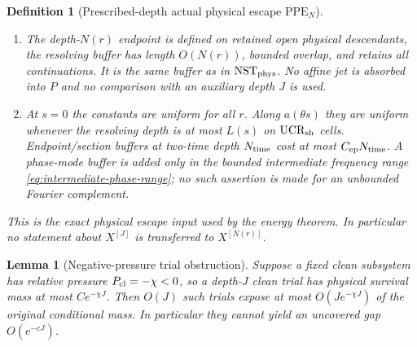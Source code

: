 \documentclass[11pt]{article}
\newtheorem{lemma}[theorem]{Lemma}
\newtheorem{definition}[theorem]{Definition}
\begin{document}
\begin{definition}[Prescribed-depth actual physical escape
$\mathrm{PPE}_{N}$]
\begin{enumerate}[label=\textup{(PPE\arabic*)}]
\begin{equation}
       \sup_{P\in\mathbb R_{d_Z}[z]}
       \mu_{\beta,Q}^{u,A}
       \{|X_{\beta,Q}^{[N(r)]}-P|\le Cr\}
       \le C\mathfrak m_{\rm PPE}(a,r,y)\,
       r^{\Theta_{\rm PPE}}.
      \end{equation}
      For some $p_{\rm PPE}>1$, the same stopped complete-tree law must also
      satisfy
      \begin{equation}
      \label{eq:ppe-mark-conditional-moment}
       \sup_{\textup{frozen parents},\,r}
       \mathbb E_{\rm stop}\!\left[
        \mathfrak m_{\rm PPE}(a,r,y)^{p_{\rm PPE}}
        \mid\mathcal F_{\rm parent}\right]\le C.
      \end{equation}
      The Borel registry makes the displayed mark a genuine stopped-tree
      random variable.  Equations \eqref{eq:ppe-weighted-amplitude-sublevel} and
      \eqref{eq:ppe-mark-conditional-moment} are required on the same
      descendants.  Neither unweighted \textup{(PPE1)} nor a mark moment
      under another partition is a substitute.  This local clause does not
      control context, stopping, buffer, gate, or continuation failures and
      does not by itself imply the full-$\mathscr W_*$ estimate
      \eqref{eq:tilted-PPE-tail}.
\item The depth-$N(r)$ endpoint is defined on retained open physical
      descendants, the resolving buffer has length $O(N(r))$, bounded
      overlap, and retains all continuations.  It is the same buffer as in
      $\mathrm{NST}_{\rm phys}$.  No affine jet is absorbed into $P$ and no
      comparison with an auxiliary depth $J$ is used.
\item At $s=0$ the constants are uniform for all $r$.  Along
      $a(\theta s)$ they are uniform whenever the resolving depth is at most
      $L(s)$ on $\mathrm{UCR}_{\rm sh}$ cells.  Endpoint/section buffers at
      two-time depth $N_{\rm time}$ cost at most
      $C_{\rm ep}N_{\rm time}$.  A phase-mode buffer is added only in the
      bounded intermediate frequency range
      \eqref{eq:intermediate-phase-range}; no such assertion is made for an
      unbounded Fourier complement.
\end{enumerate}
This is the exact physical escape input used by the energy theorem.  In
particular no statement about $X^{[J]}$ is transferred to $X^{[N(r)]}$.
\end{definition}

\begin{lemma}[Negative-pressure trial obstruction]
\label{lem:negative-pressure-trial-obstruction}
Suppose a fixed clean subsystem has relative pressure
$P_{\rm cl}=-\chi<0$, so a depth-$J$ clean trial has physical survival mass
at most $Ce^{-\chi J}$.  Then $O(J)$ such trials expose at most
$O(Je^{-\chi J})$ of the original conditional mass.  In particular they
cannot yield an uncovered gap $O(e^{-cJ})$.
\end{lemma}
\end{document}
